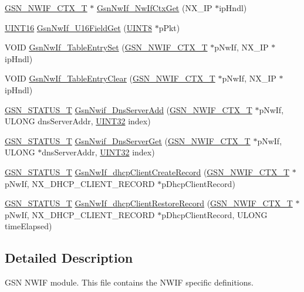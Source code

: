 \begin{DoxyCompactItemize}
\item 
\hyperlink{a00167}{GSN\_\-NWIF\_\-CTX\_\-T} $\ast$ \hyperlink{a00534_a6d18aa4993dd1d87f313bf079e8a0eb0}{GsnNwIf\_\-NwIfCtxGet} (NX\_\-IP $\ast$ipHndl)
\item 
\hyperlink{a00660_ga09f1a1fb2293e33483cc8d44aefb1eb1}{UINT16} \hyperlink{a00534_ad93c46208348880f4e124769fcc1daea}{GsnNwIf\_\-U16FieldGet} (\hyperlink{a00660_gab27e9918b538ce9d8ca692479b375b6a}{UINT8} $\ast$pPkt)
\item 
VOID \hyperlink{a00534_a38e642072683d1a5971623d3540db5a7}{GsnNwIf\_\-TableEntrySet} (\hyperlink{a00167}{GSN\_\-NWIF\_\-CTX\_\-T} $\ast$pNwIf, NX\_\-IP $\ast$ipHndl)
\item 
VOID \hyperlink{a00534_a4e53cd5f3eed0e1415abd9cda43b0945}{GsnNwIf\_\-TableEntryClear} (\hyperlink{a00167}{GSN\_\-NWIF\_\-CTX\_\-T} $\ast$pNwIf, NX\_\-IP $\ast$ipHndl)
\item 
\hyperlink{a00659_gae36517c0f5872426a7034c9551eb96ac}{GSN\_\-STATUS\_\-T} \hyperlink{a00534_a41fa414e85aaf3e85ca651ef6e86c7a8}{GsnNwif\_\-DnsServerAdd} (\hyperlink{a00167}{GSN\_\-NWIF\_\-CTX\_\-T} $\ast$pNwIf, ULONG dnsServerAddr, \hyperlink{a00660_gae1e6edbbc26d6fbc71a90190d0266018}{UINT32} index)
\item 
\hyperlink{a00659_gae36517c0f5872426a7034c9551eb96ac}{GSN\_\-STATUS\_\-T} \hyperlink{a00534_a7aaafb9175778a2e4376c7213c5d4dfd}{GsnNwif\_\-DnsServerGet} (\hyperlink{a00167}{GSN\_\-NWIF\_\-CTX\_\-T} $\ast$pNwIf, ULONG $\ast$dnsServerAddr, \hyperlink{a00660_gae1e6edbbc26d6fbc71a90190d0266018}{UINT32} index)
\item 
\hyperlink{a00659_gae36517c0f5872426a7034c9551eb96ac}{GSN\_\-STATUS\_\-T} \hyperlink{a00534_a1d6b77efc1ea0c3233453b7912a02f54}{GsnNwIf\_\-dhcpClientCreateRecord} (\hyperlink{a00167}{GSN\_\-NWIF\_\-CTX\_\-T} $\ast$pNwIf, NX\_\-DHCP\_\-CLIENT\_\-RECORD $\ast$pDhcpClientRecord)
\item 
\hyperlink{a00659_gae36517c0f5872426a7034c9551eb96ac}{GSN\_\-STATUS\_\-T} \hyperlink{a00534_ad951c5f3241c7a1d2deab7ecee17f7a8}{GsnNwIf\_\-dhcpClientRestoreRecord} (\hyperlink{a00167}{GSN\_\-NWIF\_\-CTX\_\-T} $\ast$pNwIf, NX\_\-DHCP\_\-CLIENT\_\-RECORD $\ast$pDhcpClientRecord, ULONG timeElapsed)
\end{DoxyCompactItemize}


\subsection{Detailed Description}
GSN NWIF module. This file contains the NWIF specific definitions. 

